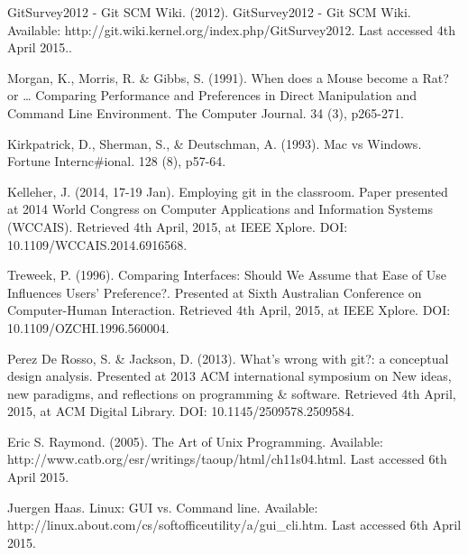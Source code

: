 \documentclass[12pt,a4paper,article,compsoc]{IEEEtran}
\begin{document}
		\newpage
		\begin{thebibliography}{1}
			
			GitSurvey2012 - Git SCM Wiki. (2012). GitSurvey2012 - Git SCM Wiki. Available: http://git.wiki.kernel.org/index.php/GitSurvey2012. Last accessed 4th April 2015..
			
			Morgan, K., Morris, R. \& Gibbs, S. (1991). When does a Mouse become a Rat? or … Comparing Performance and Preferences in Direct Manipulation and Command Line Environment. The Computer Journal. 34 (3), p265-271.
			
			Kirkpatrick, D., Sherman, S., \& Deutschman, A. (1993). Mac vs Windows. Fortune Internc\#ional. 128 (8), p57-64.
			
			Kelleher, J. (2014, 17-19 Jan). Employing git in the classroom. Paper presented at 2014 World Congress on Computer Applications and Information Systems (WCCAIS). Retrieved 4th April, 2015, at IEEE Xplore. DOI: 10.1109/WCCAIS.2014.6916568.
			
			Treweek, P. (1996). Comparing Interfaces: Should We Assume that Ease of Use Influences Users' Preference?. Presented at Sixth Australian Conference on Computer-Human Interaction. Retrieved 4th April, 2015, at IEEE Xplore. DOI: 10.1109/OZCHI.1996.560004.
			
			
			Perez De Rosso, S. \& Jackson, D. (2013). What's wrong with git?: a conceptual design analysis. Presented at 2013 ACM international symposium on New ideas, new paradigms, and reflections on programming \& software. Retrieved 4th April, 2015, at ACM Digital Library. DOI: 10.1145/2509578.2509584.
			
			Eric S. Raymond. (2005). The Art of Unix Programming.
			Available: http://www.catb.org/esr/writings/taoup/html/ch11s04.html.
			Last accessed 6th April 2015.
			
			Juergen Haas. Linux: GUI vs. Command line. Available: http://linux.about.com/cs/softofficeutility/a/gui\_cli.htm. Last accessed 6th April 2015.
			
		\end{thebibliography}
\end{document}
